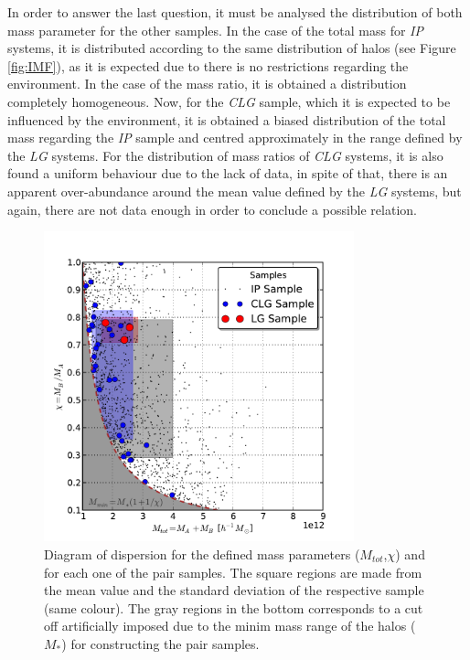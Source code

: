 In order to answer the last question, it must be analysed the distribution
of both mass parameter for the other samples. In the case of the total 
mass for \textit{IP} systems, it is distributed according to the same 
distribution of halos (see Figure \ref{fig:IMF}), as it is expected due
to there is no restrictions regarding the environment. In the case of
the mass ratio, it is obtained a distribution completely homogeneous. Now,
for the \textit{CLG} sample, which it is expected to be influenced by the 
environment, it is obtained a biased distribution of the total mass 
regarding the \textit{IP} sample and centred approximately in the range
defined by the \textit{LG} systems. For the distribution of mass ratios
of \textit{CLG} systems, it is also found a uniform behaviour due to the
lack of data, in spite of that, there is an apparent over-abundance around
the mean value defined by the \textit{LG} systems, but again, there are 
not data enough in order to conclude a possible relation.


\newpage
\begin{figure}[htbp]
	\centering
	\includegraphics[trim = 0mm 0mm 0mm 10mm, clip, width=0.8\textwidth]
	{./figures/4_results/IP_Mass_vs_Ratio.pdf}
	
	\caption{\small{Diagram of dispersion for the defined mass parameters
	($M_{tot}$,$\chi$) and for each one of the pair samples. The 
	square regions are made from the mean value and the standard deviation
	of the respective sample (same colour). The gray regions in the bottom
	corresponds to a cut off artificially imposed due to the minim mass 
	range of the halos ($M_*$) for constructing the pair samples.}}
	\label{fig:Dispersion_Mass_CLG}
\end{figure}


